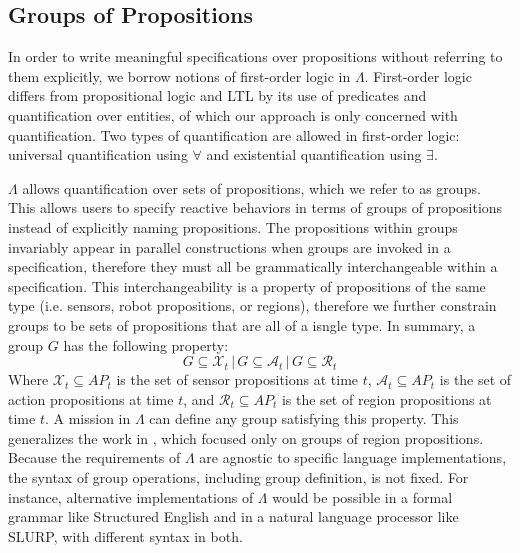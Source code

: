 \subsection{Groups of Propositions} 

In order to write meaningful specifications over propositions without referring to them explicitly, we borrow notions of first-order logic in $\Lambda$. 
First-order logic differs from propositional logic and LTL by its use of predicates and quantification over entities, of which our approach is only concerned with quantification. 
Two types of quantification are allowed in first-order logic: universal quantification using $\forall$ and existential quantification using $\exists$. 
\par $\Lambda$ allows quantification over sets of propositions, which we refer to as groups. 
This allows users to specify reactive behaviors in terms of groups of propositions instead of explicitly naming propositions. 
The propositions within groups invariably appear in parallel constructions when groups are invoked in a specification, therefore they must all be grammatically interchangeable within a specification. 
This interchangeability is a property of propositions of the same type (i.e. sensors, robot propositions, or regions), therefore we further constrain groups to be sets of propositions that are all of a isngle type. 
In summary, a group $G$ has the following property:
\begin{equation}
	G \subseteq \mathcal{X}_t\,|\,G \subseteq \mathcal{A}_t\,|\,G \subseteq \mathcal{R}_t
\end{equation}
Where $\mathcal{X}_t \subseteq AP_t$ is the set of sensor propositions at time $t$, $\mathcal{A}_t \subseteq AP_t$ is the set of action propositions at time $t$, and $\mathcal{R}_t \subseteq AP_t$ is the set of region propositions at time $t$. 
A mission in $\Lambda$ can define any group satisfying this property.
This generalizes the work in \cite{BingxinRSS2012}, which focused only on groups of region propositions. 
Because the requirements of $\Lambda$ are agnostic to specific language implementations, the syntax of group operations, including group definition, is not fixed. 
For instance, alternative implementations of $\Lambda$ would be possible in a formal grammar like Structured English\cite{Finucane2010} and in a natural language processor like SLURP\cite{RamanRSS2013}, with different syntax in both. 

